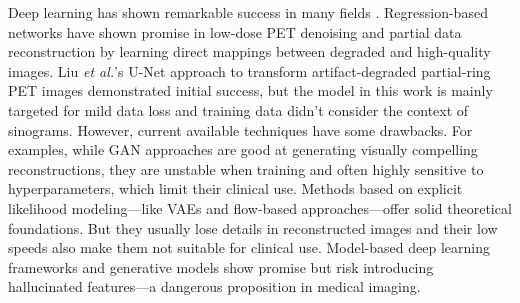 \documentclass[12pt]{iopart}
\begin{document}
Deep learning has shown remarkable success in many fields \cite{PhysRevD.110.063011, liu2024deep, reader2020deep}. Regression-based networks have shown promise in low-dose PET denoising and partial data reconstruction \cite{Kandarpa_2021} by learning direct mappings between degraded and high-quality images. Liu \textit{et al.}'s U-Net approach to transform artifact-degraded partial-ring PET images \cite{liu2019} demonstrated initial success, but the model in this work is mainly targeted for mild data loss and training data didn't consider the context of sinograms.
However, current available techniques have some drawbacks.
For examples, while GAN approaches are good at generating visually compelling reconstructions, \cite{xue2023cg3dsrganclassificationguided3d} they are unstable when training and often highly sensitive to hyperparameters, which limit their clinical use.
Methods based on explicit likelihood modeling—like VAEs and flow-based approaches—offer solid theoretical foundations. But they usually lose details in reconstructed images and their low speeds also make them not suitable for clinical use.
Model-based deep learning frameworks and generative models \cite{reader2023, vashistha2024} show promise but risk introducing hallucinated features—a dangerous proposition in medical imaging.


\end{document}
